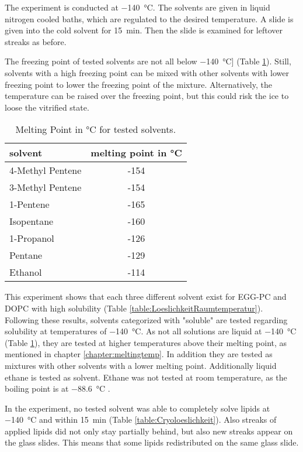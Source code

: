 The experiment is conducted at \SI{-140}{\degreeCelsius}. The solvents are given in liquid nitrogen cooled baths, which are regulated to the desired temperature. A slide is given into the cold solvent for \SI{15}{\minute}. Then the slide is examined for leftover streaks as before.

The freezing point of tested solvents are not all below \SI{-140}{\degreeCelsius}] (Table \ref{table:SchmelztemperaturLösungsmittel}). Still, solvents with a high freezing point can be mixed with other solvents with lower freezing point to lower the freezing point of the mixture. Alternatively, the temperature can be raised over the freezing point, but this could risk the ice to loose the vitrified state.

\begin{table}[hbt!]
	\centering
	\begin{tabular}{|l|c|}
		\hline
		solvent & melting point in °C \\
		\hline
		\hline
		4-Methyl Pentene & -154 \\ 
		\hline
		3-Methyl Pentene & -154 \\
		\hline
		1-Pentene & -165 \\
		\hline
		Isopentane & -160 \\
		\hline
		1-Propanol & -126 \\
		\hline
		Pentane & -129 \\
		\hline
		Ethanol & -114 \\
		\hline
	\end{tabular}
	\caption{Melting Point in °C for tested solvents.}
	\label{table:SchmelztemperaturLösungsmittel}
\end{table}

This experiment shows that each three different solvent exist for EGG-PC and DOPC with high solubility (Table \ref{table:LoeslichkeitRaumtemperatur}). Following these results, solvents categorized with "soluble" are tested regarding solubility at temperatures of \SI{-140}{\degreeCelsius}. As not all solutions are liquid at \SI{-140}{\degreeCelsius} (Table \ref{table:SchmelztemperaturLösungsmittel}), they are tested at higher temperatures above their melting point, as mentioned in chapter \ref{chapter:meltingtemp}. In addition they are tested as mixtures with other solvents with a lower melting point. Additionally liquid ethane is tested as solvent. Ethane was not tested at room temperature, as the boiling point is at \SI{-88.6}{\degreeCelsius} \cite{PubChem.29.08.2023}.

In the experiment, no tested solvent was able to completely solve lipids at \SI{-140}{\degreeCelsius} and within \SI{15}{\minute} (Table \ref{table:Cryoloeslichkeit}). Also streaks of applied lipids did not only stay partially behind, but also new streaks appear on the glass slides. This means that some lipids redistributed on the same glass slide.


